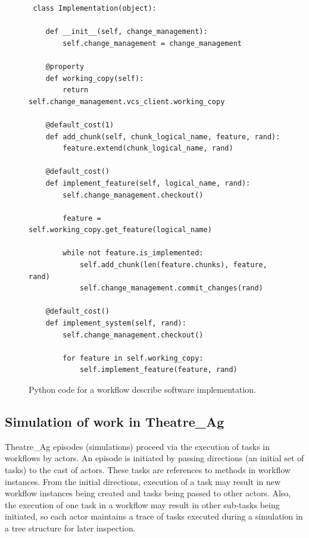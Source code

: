 \documentclass{llncs}
\begin{document}
\begin{figure}
  \centering
\begin{lstlisting}
 class Implementation(object):

    def __init__(self, change_management):
        self.change_management = change_management

    @property
    def working_copy(self):
        return self.change_management.vcs_client.working_copy

    @default_cost(1)
    def add_chunk(self, chunk_logical_name, feature, rand):
        feature.extend(chunk_logical_name, rand)

    @default_cost()
    def implement_feature(self, logical_name, rand):
        self.change_management.checkout()

        feature = self.working_copy.get_feature(logical_name)

        while not feature.is_implemented:
            self.add_chunk(len(feature.chunks), feature, rand)
            self.change_management.commit_changes(rand)

    @default_cost()
    def implement_system(self, rand):
        self.change_management.checkout()

        for feature in self.working_copy:
            self.implement_feature(feature, rand)

\end{lstlisting}
  \caption{Python code for a workflow describe software implementation.}
  \label{fig:implementation-workflow}

\end{figure}


\subsection{Simulation of work in Theatre\_Ag}


Theatre\_Ag episodes (simulations) proceed via the execution of tasks in workflows by actors.  An episode is initiated by
passing directions (an initial set of tasks) to the cast of actors.  These tasks are references to methods in workflow
instances.  From the initial directions, execution of a task may result in new workflow instances being created and
tasks being passed to other actors.  Also, the execution of one task in a workflow may result in other sub-tasks being
initiated, so each actor maintains a trace of tasks executed during a simulation in a tree structure for later
inspection.
\end{document}
